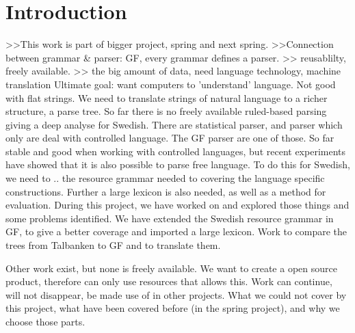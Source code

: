 \documentclass{report}
\begin{document}
\section{Introduction} 
>>This work is part of bigger project, spring and next spring.
>>Connection between grammar & parser: GF, every grammar defines a parser.
>> reusablilty, freely available.
>> the big amount of data, need language technology, machine translation
Ultimate goal: want computers to 'understand' language. Not good with flat strings.
We need to translate strings of natural language to a richer structure,
a parse tree. So far there is no
freely available ruled-based parsing giving a deep analyse for Swedish.
There are statistical parser, and parser which only are deal with controlled language.
The GF parser are one of those. 
So far stable and good when working with controlled languages, but recent experiments
have showed that it is also possible to parse free language.
To do this for Swedish, we need to  .. the resource grammar needed to covering
the language specific constructions. Further a large lexicon is also needed, as well
as a method for evaluation.
During this project, we have worked on and explored those things and some problems identified.
We have extended the Swedish resource grammar in GF, to give a better coverage and imported
a large lexicon. Work to compare the trees from Talbanken to GF and to translate them.



Other work exist, but none is freely available. We want to create a open source
product, therefore can only use resources that allows this. Work can continue,
will not disappear, be made use of in other projects.
What we could not cover by this project, what have been covered before (in
the spring project), and why we choose those parts.
\end{document}
